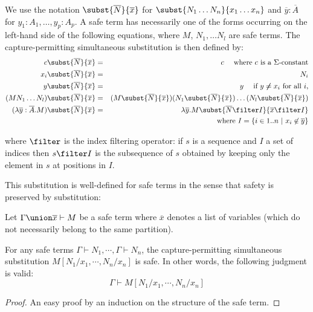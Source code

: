 \begin{definition}
\label{dnf:safe_simsubst} We use the notation
$\subst{\overline{N}}{\overline{x}}$ for $\subst{N_1 \ldots N_n}{x_1
\ldots x_n}$ and $\overline{y}:\overline{A}$ for $y_1:A_1, \ldots,
y_p:A_p$. A safe term has necessarily one of the forms occurring on
the left-hand side of the following equations, where $M$, $N_1,
\ldots N_l$ are safe terms. The capture-permitting simultaneous
substitution is then defined by:
\begin{eqnarray*}
c \subst{\overline{N}}{\overline{x}} &=& c \quad \mbox{ where $c$ is a $\Sigma$-constant}\\
x_i \subst{\overline{N}}{\overline{x}} &=& N_i\\
 y \subst{\overline{N}}{\overline{x}} &=& y \quad \mbox{ if } y \not \neq x_i \mbox{ for all } i,\\
(M N_1 \ldots N_l) \subst{\overline{N}}{\overline{x}} &=& (M \subst{\overline{N}}{\overline{x}}) (N_1 \subst{\overline{N}}{\overline{x}}) \ldots  (N_l \subst{\overline{N}}{\overline{x}})\\
(\lambda \overline{y} : \overline{A}. M)
\subst{\overline{N}}{\overline{x}} &=& \lambda \overline{y} . M
\subst{\overline{N} \filter I}{\overline{x} \filter I} \\
&& \mbox{where } I  = \{ i \in 1..n \ | \ x_i \not \in \overline{y} \}
\end{eqnarray*}

where $ \filter$ is the index filtering operator: if $s$ is
a sequence and $I$ a set of indices then $s \filter I$ is
the subsequence of $s$ obtained by keeping only the element in $s$
at positions in $I$.
\end{definition}

This substitution is well-defined for safe terms in the sense that safety is preserved by substitution:

\begin{lemma}
\label{lem:subst_preserve_safety} Let $\Gamma \union \overline{x}
\vdash M$ be a safe term where $\overline{x}$ denotes a list of
variables (which do not necessarily belong to the same partition).

For any safe terms $\Gamma \vdash N_1, \cdots, \Gamma \vdash N_n$,
the capture-permitting simultaneous substitution $M[N_1 / x_1 ,
\cdots, N_n / x_n]$ is safe. In other words, the following judgment
is valid:
$$ \Gamma \vdash M[N_1 / x_1 , \cdots, N_n / x_n] $$
\end{lemma}
\begin{proof}
An easy proof by an induction on the structure of the safe term.
\end{proof}



